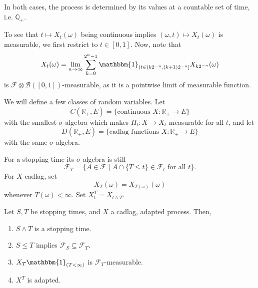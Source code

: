 \documentclass[12pt]{article}
\begin{document}
In both cases, the process is determined by its values at a countable set of time, i.e. $\mathbb{Q}_+$.

To see that $t \mapsto X_t(\omega)$ being continuous implies $(\omega, t) \mapsto X_t(\omega)$ is measurable, we first restrict to $t \in [0, 1]$. Now, note that
\[
X_t(\omega) = \lim_{n \to \infty} \sum_{k = 0}^{2^{n}-1} \mathbbm{1}_{(t \in (k 2^{-n}, (k+1)2^{-n}]} X_{k 2^{-n}}(\omega)
\]
is $\mathcal{F} \otimes \mathcal{B}([0, 1])$-measurable, as it is a pointwise limit of measurable function.

We will define a few classes of random variables. Let
\[
	C(\mathbb{R}_+, E) = \{\text{continuous } X : \mathbb{R}_+ \to E\}
\]
with the smallest $\sigma$-algebra which makes $\Pi_t : X \to X_t$ measurable for all $t$, and let
\[
	D(\mathbb{R}_+, E) = \{\text{cadlag functions } X : \mathbb{R}_+ \to E\}
\]
with the same $\sigma$-algebra.

For a stopping time its $\sigma $-algebra is still
\[
	\mathcal{F}_T = \{A \in \mathcal{F} \mid A \cap \{T \leq t\} \in \mathcal{F}_t \text{ for all }t \}.
\]
For $X$ cadlag, set
\[
X_T(\omega) = X_{T(\omega)}(\omega)
\]
whenever $T(\omega) < \infty$. Set $X^{T}_t = X_{t \wedge T}$.

\begin{proposition}
	Let $S, T$ be stopping times, and $X$ a cadlag, adapted process. Then,
	\begin{enumerate}[\normalfont(i)]
		\item $S \wedge T$ is a stopping time.
		\item $S \leq T$ implies $\mathcal{F}_S \subseteq \mathcal{F}_T$.
		\item $X_T \mathbbm{1}_{(T < \infty)}$ is $\mathcal{F}_T$-measurable.
		\item $X^T$ is adapted.
	\end{enumerate}
\end{proposition}
\end{document}
